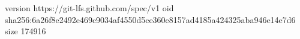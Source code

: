 version https://git-lfs.github.com/spec/v1
oid sha256:6a26f8e2492e469c9034af4550d5ce360e8157ad4185a424325aba946e14e7d6
size 174916
